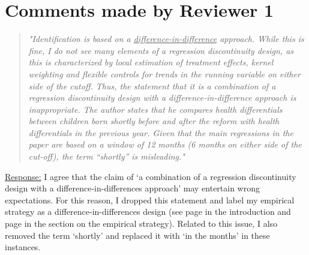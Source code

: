 
\clearpage
\section*{Comments made by Reviewer 1}


\begin{quote}
	\textit{"Identification is based on a \underline{difference-in-difference} approach. While this is fine, I do not see many elements of a regression discontinuity design, as this is characterized by local estimation of treatment effects, kernel weighting and flexible controls for trends in the running variable on either side of the cutoff. Thus, the statement that it is a combination of a regression discontinuity design with a difference-in-difference approach is inappropriate. The author states that he compares health differentials between children born shortly before and after the reform with health differentials in the previous year. Given that the main regressions in the paper are based on a window of 12 months (6 months on either side of the cut-off), the term “shortly” is misleading."}
\end{quote}
\underline{Response:} I agree that the claim of `a combination of a regression discontinuity design with a difference-in-differences approach' may entertain wrong expectations. For this reason, I dropped this statement and label my empirical strategy as a difference-in-differences design (see page \pageref{rev_mlch: r1_rdd+did_intro} in the introduction and page \pageref{rev_mlch: r1_rdd+did_em_section} in the section on the empirical strategy). Related to this issue, I also removed the term `shortly' and replaced it with `in the months' in these instances.


